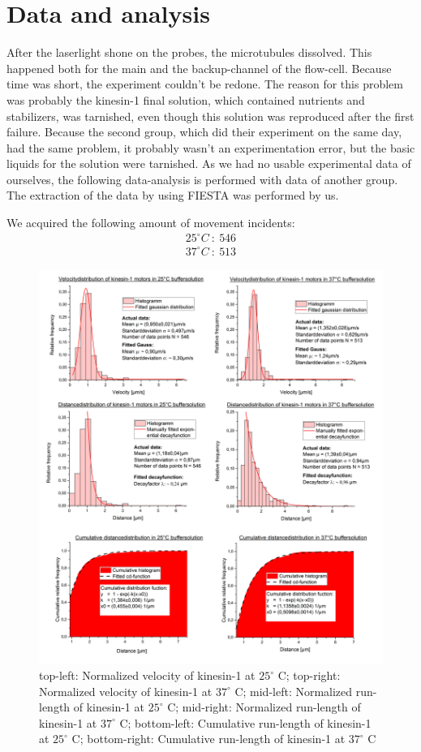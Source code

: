 \documentclass[english, %
parskip=full, %
bibliography=totoc, %
]{scrartcl}
\begin{document}
\section{Data and analysis}

After the laserlight shone on the probes, the microtubules dissolved. This happened both for the main and the backup-channel of the flow-cell. Because time was short, the experiment couldn't be redone.
The reason for this problem was probably the kinesin-1 final solution, which contained nutrients and stabilizers, was tarnished, even though this solution was reproduced after the first failure. Because the second group, which did their experiment on the same day, had the same problem, it probably wasn't an experimentation error, but the basic liquids for the solution were tarnished. 
As we had no usable experimental data of ourselves, the following data-analysis is performed with data of another group. The extraction of the data by using FIESTA was performed by us. 

We acquired the following amount of movement incidents: 
\begin{align*}
25^\circ C \ : \ 546 \\
37^\circ C \ : \ 513
\end{align*}

\begin{figure}[htp] 
  \centering
     \includegraphics[width=1.0\textwidth]{all_diagrams.png}
  \caption{top-left: Normalized velocity of kinesin-1 at $25^\circ$ C; top-right: Normalized velocity of kinesin-1 at $37^\circ$ C; mid-left: Normalized run-length of kinesin-1 at $25^\circ$ C; mid-right: Normalized run-length of kinesin-1 at $37^\circ$ C; bottom-left: Cumulative run-length of kinesin-1 at $25^\circ$ C; bottom-right: Cumulative run-length of kinesin-1 at $37^\circ$ C}
  \label{fig:diagrams}
\end{figure}
\end{document}
